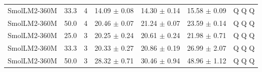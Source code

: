 \documentclass{article}
\begin{document}
\begin{longtable}{lrrrrrl}
SmolLM2-360M & 33.3 & 4 & 14.09 $\pm$ 0.08 & 14.30 $\pm$ 0.14 & 15.58 $\pm$ 0.09 & Q Q Q \\
SmolLM2-360M & 50.0 & 4 & 20.46 $\pm$ 0.07 & 21.24 $\pm$ 0.07 & 23.59 $\pm$ 0.14 & Q Q Q \\
SmolLM2-360M & 25.0 & 3 & 20.25 $\pm$ 0.24 & 20.61 $\pm$ 0.24 & 21.98 $\pm$ 0.71 & Q Q Q \\
SmolLM2-360M & 33.3 & 3 & 20.33 $\pm$ 0.27 & 20.86 $\pm$ 0.19 & 26.99 $\pm$ 2.07 & Q Q Q \\
SmolLM2-360M & 50.0 & 3 & 28.32 $\pm$ 0.71 & 30.46 $\pm$ 0.94 & 48.96 $\pm$ 1.12 & Q Q Q \\
\bottomrule\end{longtable}
\end{document}
